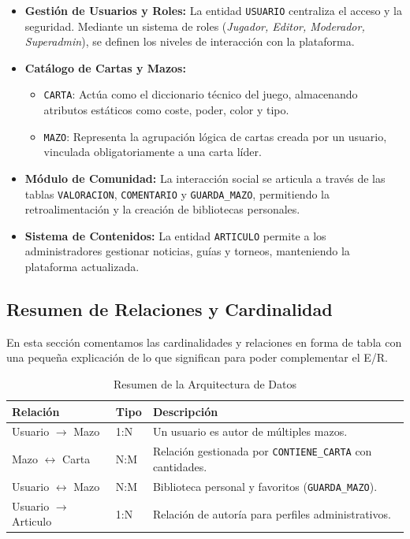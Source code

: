 \documentclass[10pt]{article}
\begin{document}
			\begin{itemize}
				\item \textbf{Gestión de Usuarios y Roles:} La entidad \texttt{USUARIO} centraliza el acceso y la seguridad. Mediante un sistema de roles (\textit{Jugador, Editor, Moderador, Superadmin}), se definen los niveles de interacción con la plataforma.
				\item \textbf{Catálogo de Cartas y Mazos:} 
				\begin{itemize}
					\item \texttt{CARTA}: Actúa como el diccionario técnico del juego, almacenando atributos estáticos como coste, poder, color y tipo.
					\item \texttt{MAZO}: Representa la agrupación lógica de cartas creada por un usuario, vinculada obligatoriamente a una carta líder.
				\end{itemize}
				\item \textbf{Módulo de Comunidad:} La interacción social se articula a través de las tablas \texttt{VALORACION}, \texttt{COMENTARIO} y \texttt{GUARDA\_MAZO}, permitiendo la retroalimentación y la creación de bibliotecas personales.
				\item \textbf{Sistema de Contenidos:} La entidad \texttt{ARTICULO} permite a los administradores gestionar noticias, guías y torneos, manteniendo la plataforma actualizada.
			\end{itemize}
			
			\subsection{Resumen de Relaciones y Cardinalidad}
			
			En esta sección comentamos las cardinalidades y relaciones en forma de tabla con una pequeña explicación de lo que significan para poder complementar el E/R.
			
			\begin{table}[H]
				\centering
				
				\begin{tabularx}{\textwidth}{l l X}
					\toprule
					\textbf{Relación} & \textbf{Tipo} & \textbf{Descripción} \\
					\midrule
					Usuario $\rightarrow$ Mazo & 1:N & Un usuario es autor de múltiples mazos. \\
					Mazo $\leftrightarrow$ Carta & N:M & Relación gestionada por \texttt{CONTIENE\_CARTA} con cantidades. \\
					Usuario $\leftrightarrow$ Mazo & N:M & Biblioteca personal y favoritos (\texttt{GUARDA\_MAZO}). \\
					Usuario $\rightarrow$ Articulo & 1:N & Relación de autoría para perfiles administrativos. \\
					\bottomrule
				\end{tabularx}
				\caption{Resumen de la Arquitectura de Datos} 
			\end{table}
			
\end{document}
